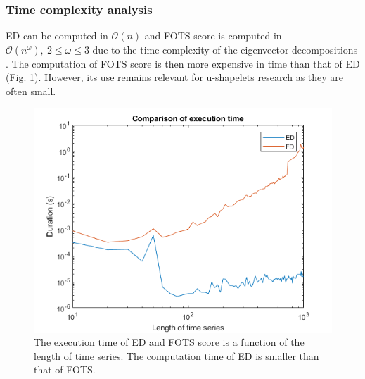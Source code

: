 \subsubsection{Time complexity analysis} ED can be computed in $\mathcal{O}(n)$ and  FOTS score is computed in $\mathcal{O}(n^\omega),\:2\leq\omega\leq3$ due to the time complexity of the eigenvector decompositions \cite{pan1999complexity}. The computation of FOTS score is then more expensive in time than that of ED (Fig. \ref{timecomparison}). However, its use remains relevant for u-shapelets research as they are often small.


\begin{figure}[h]
\centering
 \includegraphics[scale=0.50]{images/temps_ED_FOTS}
\caption{The execution time of ED and FOTS score is a function of the length of time series. The computation time of ED is smaller than that of FOTS.}
\label{timecomparison}
\end{figure}



